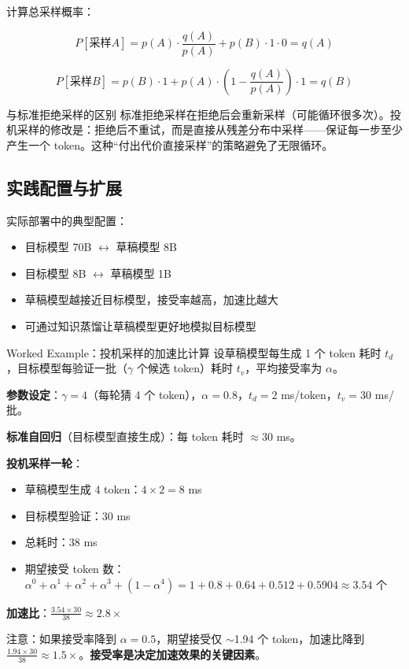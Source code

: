 \documentclass[a4paper]{article}
\begin{document}
计算总采样概率：

$$P[\text{采样} A] = p(A) \cdot \frac{q(A)}{p(A)} + p(B) \cdot 1 \cdot 0 = q(A)$$

$$P[\text{采样} B] = p(B) \cdot 1 + p(A) \cdot \left(1 - \frac{q(A)}{p(A)}\right) \cdot 1 = q(B)$$

\begin{knowledgebox}{与标准拒绝采样的区别}
标准拒绝采样在拒绝后会重新采样（可能循环很多次）。投机采样的修改是：拒绝后不重试，而是直接从残差分布中采样——保证每一步至少产生一个 token。这种``付出代价直接采样''的策略避免了无限循环。
\end{knowledgebox}

\subsection{实践配置与扩展}

实际部署中的典型配置：

\begin{itemize}
    \item 目标模型 70B $\leftrightarrow$ 草稿模型 8B
    \item 目标模型 8B $\leftrightarrow$ 草稿模型 1B
    \item 草稿模型越接近目标模型，接受率越高，加速比越大
    \item 可通过知识蒸馏让草稿模型更好地模拟目标模型
\end{itemize}

\begin{knowledgebox}{Worked Example：投机采样的加速比计算}
设草稿模型每生成 1 个 token 耗时 $t_d$，目标模型每验证一批（$\gamma$ 个候选 token）耗时 $t_v$，平均接受率为 $\alpha$。

\textbf{参数设定}：$\gamma = 4$（每轮猜 4 个 token），$\alpha = 0.8$，$t_d = 2$ ms/token，$t_v = 30$ ms/批。

\textbf{标准自回归}（目标模型直接生成）：每 token 耗时 $\approx 30$ ms。

\textbf{投机采样一轮}：
\begin{itemize}
    \item 草稿模型生成 4 token：$4 \times 2 = 8$ ms
    \item 目标模型验证：$30$ ms
    \item 总耗时：$38$ ms
    \item 期望接受 token 数：$\alpha^0 + \alpha^1 + \alpha^2 + \alpha^3 + (1 - \alpha^4) = 1 + 0.8 + 0.64 + 0.512 + 0.5904 \approx 3.54$ 个
\end{itemize}

\textbf{加速比}：$\frac{3.54 \times 30}{38} \approx 2.8\times$

注意：如果接受率降到 $\alpha = 0.5$，期望接受仅 $\sim$1.94 个 token，加速比降到 $\frac{1.94 \times 30}{38} \approx 1.5\times$。\textbf{接受率是决定加速效果的关键因素}。
\end{knowledgebox}
\end{document}
